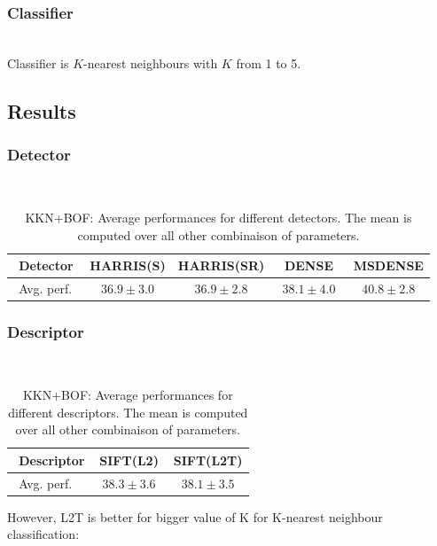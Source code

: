 \documentclass[10pt,a4paper]{llncs}
\begin{document}
\subsubsection{Classifier}$~$\\
Classifier is $K$-nearest neighbours with $K$ from 1 to 5.

\subsection{Results}


\subsubsection{Detector}$~$\\

\begin{table}[H]
\centering
\caption{KKN+BOF: Average performances for different detectors. The mean is computed over all other combinaison of parameters.}
\label{table:KNN_BOF:Detector}
\begin{tabular}{|l|c|c|c|c|}
\hline
$~~$Detector & HARRIS(S) & HARRIS(SR) & DENSE & MSDENSE \\ \hline
$~~$Avg. perf.$~~$ & $~~36.9 \pm 3.0~~$ & $~~36.9 \pm 2.8~~$ & $~~38.1 \pm 4.0~~$ & $~~\mathbf{40.8 \pm 2.8}~~$ \\ \hline
\end{tabular}
\end{table}

\subsubsection{Descriptor}$~$\\

\begin{table}[H]
\centering
\caption{KKN+BOF: Average performances for different descriptors. The mean is computed over all other combinaison of parameters.}
\label{table:KNN_BOF:Descriptor}
\begin{tabular}{|l|c|c|}
\hline
$~~$Descriptor & SIFT(L2) & SIFT(L2T) \\ \hline
$~~$Avg. perf.$~~$ & $~~\mathbf{38.3 \pm 3.6}~~$ & $~~38.1 \pm 3.5~~$ \\ \hline
\end{tabular}
\end{table}

However, L2T is better for bigger value of K for K-nearest neighbour classification:
\end{document}

